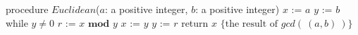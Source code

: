 
\begin{algorithm}[caption={Euclidean algorithm for calculating greatest common divisor}]
    procedure $\textit{Euclidean}$($a$: a positive integer, $b$: a positive integer)
    $x$ := $a$
    $y$ := $b$
    while $y \neq 0$
      $r$ := $x \textbf{ mod } y$
      $x$ := $y$
      $y$ := $r$
    return $x$ $\{ \textrm{the result of } gcd(~(a,b)~)\} $
\end{algorithm}